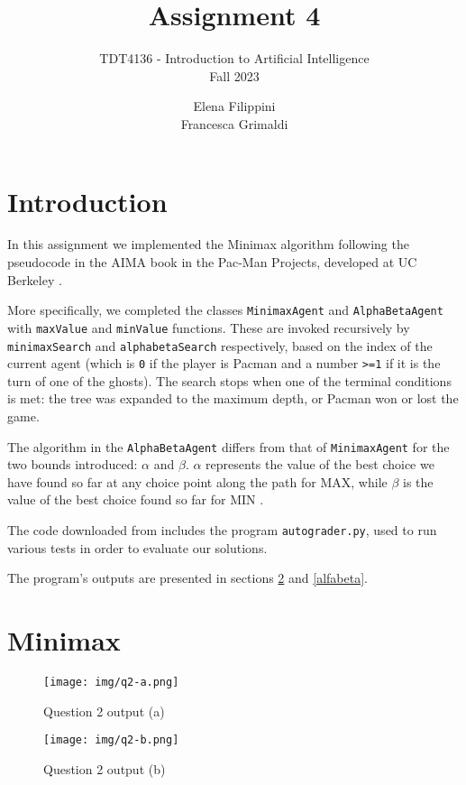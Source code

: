\documentclass{article}
\title{%
    \huge Assignment 4}
\subtitle{%
    TDT4136 - Introduction to Artificial Intelligence \\
    Fall 2023
    }
\author{%
  Elena Filippini\\
  Francesca Grimaldi
}
\date{}
\begin{document}
\maketitle



\section{Introduction}
In this assignment we implemented the Minimax algorithm following the pseudocode in the AIMA book \cite{ai} in the Pac-Man Projects, developed at UC Berkeley \cite{berkeley}.

More specifically, we completed the classes \texttt{MinimaxAgent} and \texttt{AlphaBetaAgent} with \texttt{maxValue} and \texttt{minValue} functions. These are invoked recursively by \texttt{minimaxSearch} and \texttt{alphabetaSearch} respectively, based on the index of the current agent (which is \texttt{0} if the player is Pacman and a number \texttt{>=1} if it is the turn of one of the ghosts). The search stops when one of the terminal conditions is met: the tree was expanded to the maximum depth, or Pacman won or lost the game.

The algorithm in the \texttt{AlphaBetaAgent} differs from that of \texttt{MinimaxAgent} for the two bounds introduced: $\alpha$ and $\beta$.
$\alpha$ represents the value of the best choice we have found so far at any choice point along the path for MAX, while $\beta$ is the value of the best choice found so far for MIN \cite{ai}.


The code downloaded from \cite{berkeley} includes the program \texttt{autograder.py}, used to run various tests in order to evaluate our solutions. 

The program's outputs are presented in sections \ref{min} and \ref{alfabeta}.

\section{Minimax}\label{min}
\begin{figure}[H]
    \centering
    \texttt{[image: img/q2-a.png]}
    \caption{Question 2 output (a)}
    \label{fig:q2-a}
\end{figure}

\begin{figure}[H]
    \centering
    \texttt{[image: img/q2-b.png]}
    \caption{Question 2 output (b)}
    \label{fig:q2-b}
\end{figure}
\end{document}
